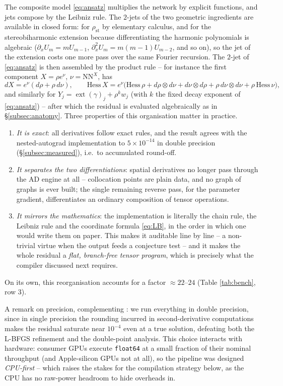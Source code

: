 \documentclass[oneside,british]{amsart}
\numberwithin{equation}{section}
\numberwithin{figure}{section}
\theoremstyle{plain}
\numberwithin{thm}{section}
\theoremstyle{plain}
\theoremstyle{plain}
\theoremstyle{definition}
\theoremstyle{remark}
\DeclareMathOperator{\ext}{\mathrm{ext}}
\newcommand{\NN}{\mathrm{NN}}
\begin{document}
The composite model \eqref{eq:ansatz} multiplies the network by
explicit functions, and jets compose by the Leibniz rule. The $2$-jets
of the two geometric ingredients are available in closed form: for
$\rho_{\mathrm{st}}$ by elementary calculus, and for the
stereobiharmonic extension because differentiating the harmonic
polynomials is algebraic ($\partial_{x}U_{m}=mU_{m-1}$,
$\partial_{x}^{2}U_{m}=m(m-1)U_{m-2}$, and so on), so the jet of the
extension costs one more pass over the same Fourier recursion. The
$2$-jet of \eqref{eq:ansatz} is then assembled by the product rule
-- for instance the first component $X=\rho e^{\nu}$, $\nu=\NN^{X}$,
has
\[
dX=e^{\nu}(d\rho+\rho\,d\nu),\qquad
\mathrm{Hess}\,X=e^{\nu}\bigl(\mathrm{Hess}\,\rho+d\rho\otimes d\nu+d\nu\otimes d\rho+\rho\,d\nu\otimes d\nu+\rho\,\mathrm{Hess}\,\nu\bigr),
\]
and similarly for $Y_{j}=\ext(\gamma)_{j}+\rho^{k}w_{j}$ (with $k$ the
fixed decay exponent of \eqref{eq:ansatz}) -- after which
the residual is evaluated algebraically as in
\S\ref{subsec:anatomy}. Three properties of this organisation matter in
practice.
\begin{enumerate}
\item \emph{It is exact}: all derivatives follow exact rules, and the
result agrees with the nested-autograd implementation to
$5\times10^{-14}$ in double precision (\S\ref{subsec:measured}), i.e.\
to accumulated round-off.
\item \emph{It separates the two differentiations}: spatial derivatives
no longer pass through the AD engine at all -- collocation points are
plain data, and no graph of graphs is ever built; the single remaining
reverse pass, for the parameter gradient, differentiates an ordinary
composition of tensor operations.
\item \emph{It mirrors the mathematics}: the implementation is
literally the chain rule, the Leibniz rule and the coordinate formula
\eqref{eq:LB}, in the order in which one would write them on paper.
This makes it auditable line by line -- a non-trivial virtue when the
output feeds a conjecture test -- and it makes the whole residual a
\emph{flat, branch-free tensor program}, which is precisely what the
compiler discussed next requires.
\end{enumerate}
On its own, this reorganisation accounts for a factor $\approx22$--$24$
(Table \ref{tab:bench}, row 3).

A remark on precision, complementing \cite[\S3.3]{SchettiniUsula2026}:
we run everything in double precision, since in single precision the
rounding incurred in second-derivative computations makes the residual
saturate near $10^{-4}$ even at a true solution, defeating both the
L-BFGS refinement and the double-point analysis. This choice interacts
with hardware: consumer GPUs execute \texttt{float64} at a small
fraction of their nominal throughput (and Apple-silicon GPUs not at
all), so the pipeline was designed \emph{CPU-first} -- which raises the
stakes for the compilation strategy below, as the CPU has no raw-power
headroom to hide overheads in.
\end{document}
